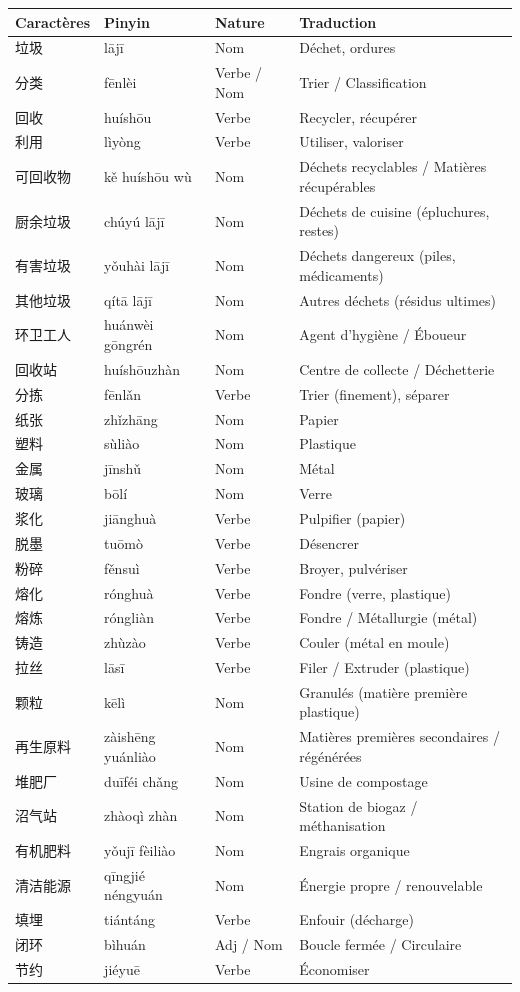 \documentclass[11pt]{article}
\begin{document}
\begin{center}
\begin{tabularx}{\linewidth}{|X|X|X|X|}
\hline
\rowcolor{popblueL} \textbf{Caractères} & \textbf{Pinyin} & \textbf{Nature} & \textbf{Traduction} \\
\hline
垃圾 & lājī & Nom & Déchet, ordures \\
分类 & fēnlèi & Verbe / Nom & Trier / Classification \\
回收 & huíshōu & Verbe & Recycler, récupérer \\
利用 & lìyòng & Verbe & Utiliser, valoriser \\
可回收物 & kě huíshōu wù & Nom & Déchets recyclables / Matières récupérables \\
厨余垃圾 & chúyú lājī & Nom & Déchets de cuisine (épluchures, restes) \\
有害垃圾 & yǒuhài lājī & Nom & Déchets dangereux (piles, médicaments) \\
其他垃圾 & qítā lājī & Nom & Autres déchets (résidus ultimes) \\
环卫工人 & huánwèi gōngrén & Nom & Agent d'hygiène / Éboueur \\
回收站 & huíshōuzhàn & Nom & Centre de collecte / Déchetterie \\
分拣 & fēnlǎn & Verbe & Trier (finement), séparer \\
纸张 & zhǐzhāng & Nom & Papier \\
塑料 & sùliào & Nom & Plastique \\
金属 & jīnshǔ & Nom & Métal \\
玻璃 & bōlí & Nom & Verre \\
浆化 & jiānghuà & Verbe & Pulpifier (papier) \\
脱墨 & tuōmò & Verbe & Désencrer \\
粉碎 & fěnsuì & Verbe & Broyer, pulvériser \\
熔化 & rónghuà & Verbe & Fondre (verre, plastique) \\
熔炼 & róngliàn & Verbe & Fondre / Métallurgie (métal) \\
铸造 & zhùzào & Verbe & Couler (métal en moule) \\
拉丝 & lāsī & Verbe & Filer / Extruder (plastique) \\
颗粒 & kēlì & Nom & Granulés (matière première plastique) \\
再生原料 & zàishēng yuánliào & Nom & Matières premières secondaires / régénérées \\
堆肥厂 & duīféi chǎng & Nom & Usine de compostage \\
沼气站 & zhàoqì zhàn & Nom & Station de biogaz / méthanisation \\
有机肥料 & yǒujī fèiliào & Nom & Engrais organique \\
清洁能源 & qīngjié néngyuán & Nom & Énergie propre / renouvelable \\
填埋 & tiántáng & Verbe & Enfouir (décharge) \\
闭环 & bìhuán & Adj / Nom & Boucle fermée / Circulaire \\
节约 & jiéyuē & Verbe & Économiser \\
\hline
\end{tabularx}
\end{center}
\end{document}
